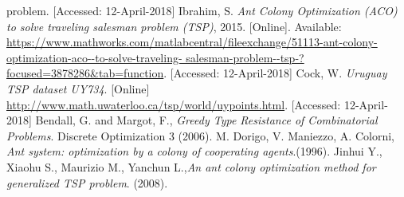 \documentclass[twocolumn]{article}
\begin{document}
\begin{thebibliography}{999}
{			problem}. [Accessed: 12-April-2018]
		Ibrahim, S.
		\emph{Ant Colony Optimization (ACO) to solve traveling salesman problem (TSP)}, 2015. [Online]. Available: \url{https://www.mathworks.com/matlabcentral/fileexchange/51113-ant-colony-
			optimization-aco--to-solve-traveling-
			salesman-problem--tsp-?focused=3878286&tab=function}. [Accessed: 12-April-2018]
		Cock, W. \emph{Uruguay TSP dataset UY734}. [Online]
		\url{http://www.math.uwaterloo.ca/tsp/world/uypoints.html}. [Accessed: 12-April-2018]
		Bendall, G. and Margot, F., \emph{Greedy Type Resistance of Combinatorial Problems}. Discrete Optimization 3 (2006).
		M. Dorigo, V. Maniezzo, A. Colorni, \emph{Ant system: optimization by a colony of cooperating agents}.(1996).
		Jinhui Y., Xiaohu S., Maurizio M., Yanchun L.,\emph{An ant colony optimization method for generalized TSP problem}. (2008).
	\end{thebibliography}
\end{document}
